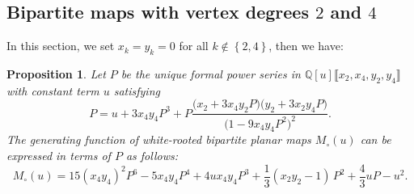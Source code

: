 \documentclass[11pt,reqno,tbtags]{amsart}
\providecommand{\Q}{}
\renewcommand{\Q}{\mathbb{Q}}
\newtheorem{prop}[theo]{Proposition}
\numberwithin{equation}{section}
\numberwithin{theo}{section}
\theoremstyle{definition}
\begin{document}
	\subsection{Bipartite maps with vertex degrees $2$ and $4$}\label{sec: Bib Quartic}
In this section, we set $x_k=y_k=0$ for all $k\notin\left\{2,4\right\}$, then we have: 
\begin{prop}\label{prop: Algebraic parametrization for M(u)}
Let $P$ be the unique formal power series in $\Q\left[u\right]\llbracket x_2,x_4, y_2,y_4\rrbracket$ with constant term $u$ satisfying
\begin{equation}\label{eq: Algebraic equation for P}
	P = u + 3x_4y_4 P^3 + P \frac{\big(x_2 + 3x_4y_2 P\big)\big(y_2 + 3x_2y_4 P\big)}{\big(1-9x_4y_4 P^2\big)^2}.
\end{equation}
The generating function of white-rooted bipartite planar maps $M_\circ(u)$ can be expressed in terms of $P$ as follows:
\begin{equation}
	M_\circ(u) = 15(x_4y_4)^2P^6 - 5x_4y_4P^4 + 4ux_4y_4P^3 + \frac{1}{3}(x_2y_2-1)\, P^2 +  \frac{4}{3}uP - u^2.
\end{equation}
\end{prop}
\end{document}
